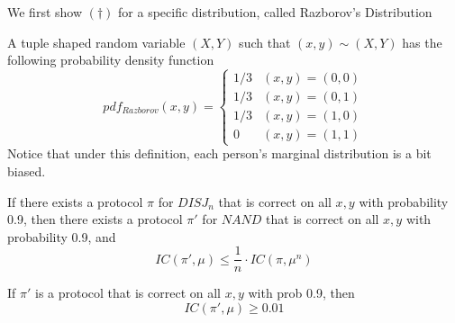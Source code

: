 We first show $(\dagger)$ for a specific distribution, called Razborov's Distribution
\begin{definition}
	A tuple shaped random variable $(X, Y)$ such that $(x, y) \sim (X, Y)$ has the following probability density function
	\begin{equation}
		pdf_{Razborov}(x, y) = \begin{cases}
			1/3 & (x, y) = (0, 0) \\
			1/3 & (x, y) = (0, 1) \\
			1/3 & (x, y) = (1, 0) \\
			0 & (x, y) = (1, 1)
		\end{cases}	
	\end{equation}
	Notice that under this definition, each person's marginal distribution is a bit biased. 
\end{definition}

\begin{theorem}
	If there exists a protocol $\pi$ for $DISJ_n$ that is correct on all $x, y$ with probability 0.9, then there exists a protocol $\pi'$ for $NAND$ that is correct on all $x, y$ with probability 0.9, and 
	\begin{equation}
		IC(\pi', \mu) \leq \frac{1}{n} \cdot IC(\pi, \mu^n)
	\end{equation}
\end{theorem}

\begin{theorem}
	[Piece 2]
	If $\pi'$ is a protocol that is correct on all $x, y$ with prob 0.9, then 
	\begin{equation}
		IC(\pi', \mu) \geq 0.01 
	\end{equation}
\end{theorem}






















